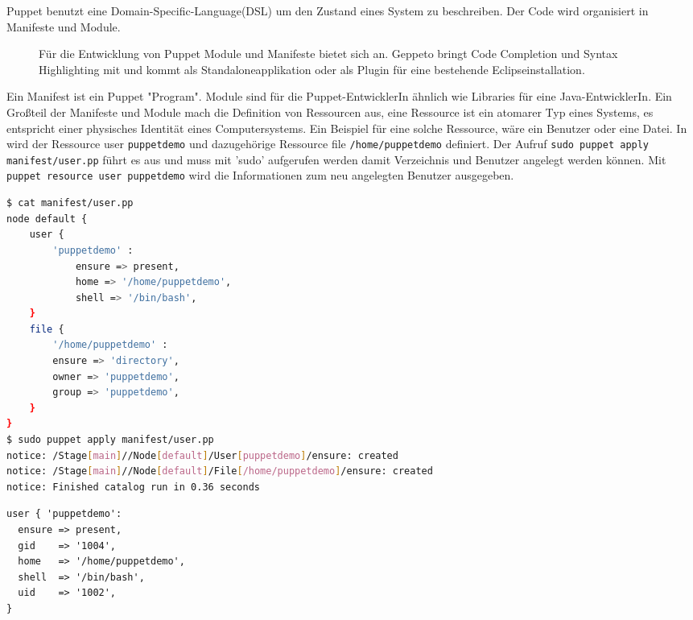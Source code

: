 \documentclass[12pt,a4paper,ngerman]{article}
\begin{document}
Puppet benutzt eine Domain-Specific-Language(DSL) um den Zustand eines System zu beschreiben. Der Code wird organisiert in Manifeste und Module.

\begin{figure}
\vspace{-20pt}
\begin{boxedminipage}{8cm}
Für die Entwicklung von Puppet Module und Manifeste bietet sich \cite{geppeto} an. Geppeto bringt Code Completion und Syntax Highlighting mit und kommt als Standaloneapplikation oder als Plugin für eine bestehende Eclipseinstallation. 
\end{boxedminipage}
\vspace{-20pt}
\end{figure}

Ein Manifest ist ein Puppet "Program". Module sind für die Puppet-EntwicklerIn ähnlich wie Libraries für eine Java-EntwicklerIn. Ein Großteil der Manifeste und Module mach die Definition von Ressourcen aus, eine Ressource ist ein atomarer Typ eines Systems, es entspricht einer physisches Identität eines Computersystems. Ein Beispiel für eine solche Ressource, wäre ein Benutzer oder eine Datei. In  wird der Ressource user \lstinline$puppetdemo$ und dazugehörige Ressource file \lstinline$/home/puppetdemo$ definiert. Der Aufruf \lstinline$sudo puppet apply manifest/user.pp$ führt es aus und muss mit 'sudo' aufgerufen werden damit Verzeichnis und Benutzer angelegt werden können.
Mit \lstinline$puppet resource user puppetdemo$ wird die Informationen zum neu angelegten Benutzer ausgegeben.


\begin{lstlisting}[language=sh,caption=User mit Puppet anlegen, label=puppet-add-user]
$ cat manifest/user.pp 
node default {
    user {
        'puppetdemo' :
            ensure => present,
            home => '/home/puppetdemo',
            shell => '/bin/bash',
    }
    file {
        '/home/puppetdemo' :
        ensure => 'directory',
        owner => 'puppetdemo',
        group => 'puppetdemo',
    }
}
$ sudo puppet apply manifest/user.pp 
notice: /Stage[main]//Node[default]/User[puppetdemo]/ensure: created
notice: /Stage[main]//Node[default]/File[/home/puppetdemo]/ensure: created
notice: Finished catalog run in 0.36 seconds
\end{lstlisting}
\begin{lstlisting}[language=puppet,caption=Anzeige der Benutzerinformation in Puppet, label=puppet-add-user-info]
user { 'puppetdemo':
  ensure => present,
  gid    => '1004',
  home   => '/home/puppetdemo',
  shell  => '/bin/bash',
  uid    => '1002',
}
\end{lstlisting}
\end{document}
